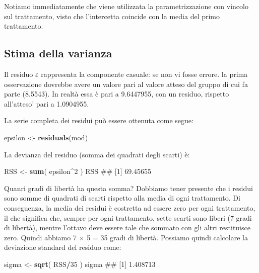 \documentclass[a4paper,12pt,oneside]{book}
\newenvironment{Shaded}{\begin{snugshade}}{\end{snugshade}}
\newcommand{\KeywordTok}[1]{\textcolor[rgb]{0.13,0.29,0.53}{\textbf{#1}}}
\newcommand{\DecValTok}[1]{\textcolor[rgb]{0.00,0.00,0.81}{#1}}
\newcommand{\StringTok}[1]{\textcolor[rgb]{0.31,0.60,0.02}{#1}}
\newcommand{\OperatorTok}[1]{\textcolor[rgb]{0.81,0.36,0.00}{\textbf{#1}}}
\newcommand{\NormalTok}[1]{#1}
\theoremstyle{definition}
\theoremstyle{definition}
\theoremstyle{definition}
\theoremstyle{remark}
\begin{document}
Notiamo immediatamente che viene utilizzata la parametrizzazione con
vincolo sul trattamento, visto che l'intercetta coincide con la media
del primo trattamento.

\subsection{Stima della varianza}\label{stima-della-varianza}

Il residuo \(\varepsilon\) rappresenta la componente casuale: se non vi
fosse errore. la prima osservazione dovrebbe avere un valore pari al
valore atteso del gruppo di cui fa parte (8.5543). In realtà essa è pari
a 9.6447955, con un residuo, rispetto all'atteso' pari a 1.0904955.

La serie completa dei residui può essere ottenuta come segue:

\begin{Shaded}
\begin{Highlighting}[]
\NormalTok{epsilon <-}\StringTok{ }\KeywordTok{residuals}\NormalTok{(mod)}
\end{Highlighting}
\end{Shaded}

La devianza del residuo (somma dei quadrati degli scarti) è:

\begin{Shaded}
\begin{Highlighting}[]
\NormalTok{RSS <-}\StringTok{ }\KeywordTok{sum}\NormalTok{( epsilon}\OperatorTok{^}\DecValTok{2}\NormalTok{ )}
\NormalTok{RSS}
\NormalTok{## [1] 69.45655}
\end{Highlighting}
\end{Shaded}

Quanri gradi di libertà ha questa somma? Dobbiamo tener presente che i
residui sono somme di quadrati di scarti rispetto alla media di ogni
trattamento. Di conseguenza, la media dei residui è costretta ad essere
zero per ogni trattamento, il che significa che, sempre per ogni
trattamento, sette scarti sono liberi (7 gradi di libertà), mentre
l'ottavo deve essere tale che sommato con gli altri restituisce zero.
Quindi abbiamo 7 \(\times\) 5 = 35 gradi di libertà. Possiamo quindi
calcolare la deviazione standard del residuo come:

\begin{Shaded}
\begin{Highlighting}[]
\NormalTok{sigma <-}\StringTok{ }\KeywordTok{sqrt}\NormalTok{( RSS}\OperatorTok{/}\DecValTok{35}\NormalTok{ )}
\NormalTok{sigma}
\NormalTok{## [1] 1.408713}
\end{Highlighting}
\end{Shaded}
\end{document}
